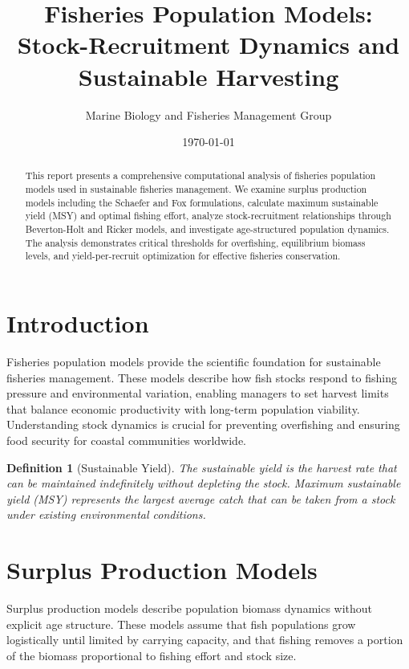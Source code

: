\documentclass[a4paper, 11pt]{article}
\title{Fisheries Population Models:\\Stock-Recruitment Dynamics and Sustainable Harvesting}
\author{Marine Biology and Fisheries Management Group}
\date{\today}
\newtheorem{definition}{Definition}[section]
\begin{document}
\maketitle

\begin{abstract}
This report presents a comprehensive computational analysis of fisheries population models
used in sustainable fisheries management. We examine surplus production models including
the Schaefer and Fox formulations, calculate maximum sustainable yield (MSY) and optimal
fishing effort, analyze stock-recruitment relationships through Beverton-Holt and Ricker
models, and investigate age-structured population dynamics. The analysis demonstrates
critical thresholds for overfishing, equilibrium biomass levels, and yield-per-recruit
optimization for effective fisheries conservation.
\end{abstract}

\section{Introduction}

Fisheries population models provide the scientific foundation for sustainable fisheries
management. These models describe how fish stocks respond to fishing pressure and
environmental variation, enabling managers to set harvest limits that balance economic
productivity with long-term population viability. Understanding stock dynamics is crucial
for preventing overfishing and ensuring food security for coastal communities worldwide.

\begin{definition}[Sustainable Yield]
The sustainable yield is the harvest rate that can be maintained indefinitely without
depleting the stock. Maximum sustainable yield (MSY) represents the largest average catch
that can be taken from a stock under existing environmental conditions.
\end{definition}

\section{Surplus Production Models}

Surplus production models describe population biomass dynamics without explicit age
structure. These models assume that fish populations grow logistically until limited by
carrying capacity, and that fishing removes a portion of the biomass proportional to
fishing effort and stock size.
\end{document}
